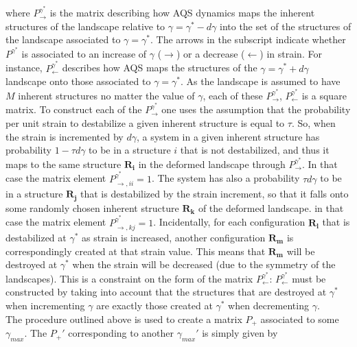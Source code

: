 where $P_{\rightarrow}^{\gamma^{*}}$ is the matrix describing how AQS dynamics maps the inherent structures of the landscape relative to $\gamma = \gamma^{*} - d\gamma$ into the set of the structures of the landscape associated to $\gamma = \gamma^{*}$. The arrows in the subscript indicate whether $P^{\gamma^{*}}$ is associated to an increase of $\gamma$ ($\rightarrow$) or a decrease ($\leftarrow$) in strain. For instance, $P_{\leftarrow}^{\gamma^{*}}$ describes how AQS maps the structures of the $\gamma = \gamma^{*} + d\gamma$ landscape onto those associated to $\gamma = \gamma^{*}$. 
As the landscape is assumed to have $M$ inherent structures no matter the value of $\gamma$, each of these $P_{\rightarrow}^{\gamma^{*}}$, $P_{\leftarrow}^{\gamma^{*}}$ is a square matrix.
To construct each of the $P_{\rightarrow}^{\gamma^{*}}$ one uses the assumption that the probability per unit strain to destabilize a given inherent structure is equal to $\tau$. So, when the strain is incremented by $d\gamma$, a system in a given inherent structure has probability $1 - \tau d\gamma$ to be in a structure $i$ that is not destabilized, and thus it maps to the same structure $\mathbf{R_i}$ in the deformed landscape through $P_{\rightarrow}^{\gamma^{*}}$. In that case the matrix element $P_{\rightarrow, ii}^{\gamma^{*}} = 1$. The system has also a probability $\tau d\gamma$ to be in a structure $\mathbf{R_j}$ that is destabilized by the strain increment, so that it falls onto some randomly chosen inherent structure $\mathbf{R_k}$ of the deformed landscape. in that case the matrix element $P_{\rightarrow, kj}^{\gamma^{*}} = 1$. Incidentally, for each configuration $\mathbf{R_l}$ that is destabilized at $\gamma^{*}$ as strain is increased, another configuration $\mathbf{R_m}$ is correspondingly created at that strain value. This means that $\mathbf{R_m}$ will be destroyed at $\gamma^{*}$ when the strain will be decreased (due to the symmetry of the landscapes). This is a constraint on the form of the matrix $P_{\leftarrow}^{\gamma^{*}}$: $P_{\leftarrow}^{\gamma^{*}}$ must be constructed by taking into account that the structures that are destroyed at $\gamma^{*}$ when incrementing $\gamma$ are exactly those created at $\gamma^{*}$ when decrementing $\gamma$.\\
The procedure outlined above is used to create a matrix $P_{+}$ associated to some $\gamma_{max}$. The $P_{+}'$ corresponding to another $\gamma_{max}'$ is simply given by 
